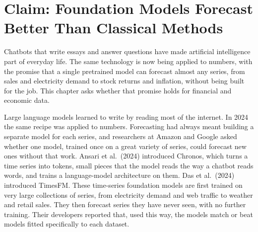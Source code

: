 \makeatletter
{}
\makeatother

\makeatletter
\makeatother

\chapter{Claim: Foundation Models Forecast Better Than Classical Methods}
\label{ch:21}

Chatbots that write essays and answer questions have made artificial intelligence part of everyday life. The same technology is now being applied to numbers, with the promise that a single pretrained model can forecast almost any series, from sales and electricity demand to stock returns and inflation, without being built for the job. This chapter asks whether that promise holds for financial and economic data.

Large language models learned to write by reading most of the internet. In 2024 the same recipe was applied to numbers. Forecasting had always meant building a separate model for each series, and researchers at Amazon and Google asked whether one model, trained once on a great variety of series, could forecast new ones without that work. Ansari et al.\ (2024) introduced Chronos, which turns a time series into tokens, small pieces that the model reads the way a chatbot reads words, and trains a language-model architecture on them. Das et al.\ (2024) introduced TimesFM. These time-series foundation models are first trained on very large collections of series, from electricity demand and web traffic to weather and retail sales. They then forecast series they have never seen, with no further training. Their developers reported that, used this way, the models match or beat models fitted specifically to each dataset.

